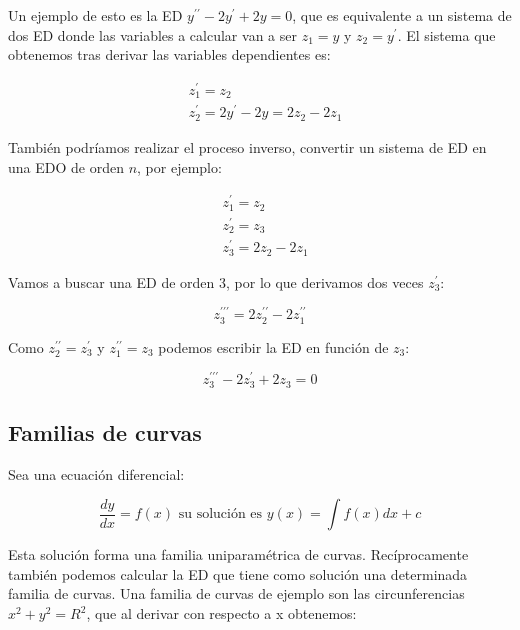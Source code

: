 \documentclass[a4paper,12pt,titlepage]{article}
\begin{document}
Un ejemplo de esto es la ED $y^{\prime \prime}-2y^{\prime}+2y=0$, que es equivalente a un sistema de dos ED donde las variables a calcular van a ser $z_1=y$ y $z_2=y^{\prime}$. El sistema que obtenemos tras derivar las variables dependientes es:

\begin{equation*}
    \begin{aligned}
    & z_1^{\prime}=z_2 \\
    & z_2^{\prime}=2 y^{\prime}-2 y=2 z_2-2 z_1
    \end{aligned}
    \end{equation*}

También podríamos realizar el proceso inverso, convertir un sistema de ED en una EDO de orden $n$, por ejemplo:

\begin{equation*}
    \begin{aligned}
    & z_1^{\prime}=z_2 \\
    & z_2^{\prime}=z_3 \\
    & z_3^{\prime}=2 z_2-2 z_1
    \end{aligned}
    \end{equation*}

Vamos a buscar una ED de orden 3, por lo que derivamos dos veces $z_3^{\prime}$:

\begin{equation*}
    z_3^{\prime \prime \prime} = 2z_2^{\prime \prime}-2z_1^{\prime \prime}
\end{equation*}

Como $z_2^{\prime \prime}=z_3^{\prime}$ y $z_1^{\prime \prime}=z_3$ podemos escribir la ED en función de $z_3$:

\begin{equation*}
    z_3^{\prime \prime \prime} - 2z_3^{\prime} + 2z_3=0
\end{equation*}

\subsection{Familias de curvas}

Sea una ecuación diferencial:

\begin{equation*}
    \frac{dy}{dx} = f(x) \text{ su solución es } y(x)=\int f(x)dx + c
\end{equation*}

Esta solución forma una familia uniparamétrica de curvas. Recíprocamente también podemos calcular la ED que tiene como solución una determinada familia de curvas. Una familia de curvas de ejemplo son las circunferencias $x^2+y^2=R^2$, que al derivar con respecto a x obtenemos:
\end{document}
